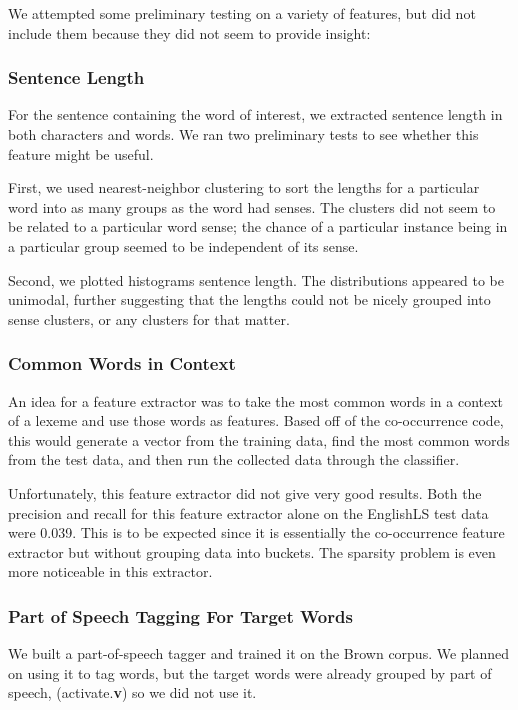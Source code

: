 \documentclass{article}
\begin{document}
We attempted some preliminary testing on a variety of features, but did not include them because they did not seem to provide insight:

\subsubsection{Sentence Length} For the sentence containing the word of
interest, we extracted sentence length in both characters and words. We ran two
preliminary tests to see whether this feature might be useful.

First, we used nearest-neighbor clustering to sort the lengths for a particular
word into as many groups as the word had senses. The clusters did not seem to be
related to a particular word sense; the chance of a particular instance being in
a particular group seemed to be independent of its sense.

Second, we plotted histograms sentence length. The distributions appeared to be
unimodal, further suggesting that the lengths could not be nicely grouped into
sense clusters, or any clusters for that matter.

\subsubsection{Common Words in Context}

An idea for a feature extractor was to take the most common words in a context
of a lexeme and use those words as features. Based off of the co-occurrence code,
this would generate a vector from the training data, find the most common words
from the test data, and then run the collected data through the classifier.

Unfortunately, this feature extractor did not give very good results. Both the
precision and recall for this feature extractor alone on the EnglishLS test data
were 0.039. This is to be expected since it is essentially the co-occurrence
feature extractor but without grouping data into buckets. The sparsity problem
is even more noticeable in this extractor.

\subsubsection{Part of Speech Tagging For Target Words}

We built a part-of-speech tagger and trained it on the Brown corpus. We planned
on using it to tag words, but the target words were already grouped by part of
speech, (activate.\textbf{v}) so we did not use it.
\end{document}
